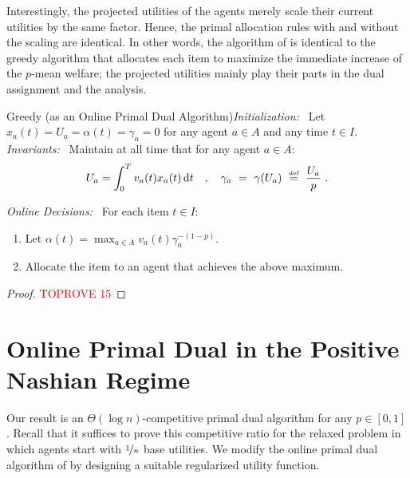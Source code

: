 \documentclass[11pt,letterpaper]{article}
\newcommand{\dif}[1]{\,\text{\rm d} #1}
\newcommand{\utility}{U}
\newcommand{\defeq}{\stackrel{\textrm{\tiny def}}{=}}
\begin{document}
Interestingly, the projected utilities of the agents merely scale their current utilities by the same factor.
Hence, the primal allocation rules with and without the scaling are identical.
In other words, the algorithm of \citet{DevanurJ:STOC:2012} is identical to the greedy algorithm that allocates each item to maximize the immediate increase of the $p$-mean welfare;
the projected utilities mainly play their parts in the dual assignment and the analysis.

\begin{algorithm}{Greedy (as an Online Primal Dual Algorithm)}\emph{Initialization:~}
   	Let $x_a(t) = \utility_a = \alpha(t) = \gamma_a = 0$ for any agent $a\in A$ and any time $t\in I$.\\[2ex]
	\emph{Invariants:~}
	Maintain at all time that for any agent $a\in A$:
    \begin{equation}
    	\label{eq:invariant-devanur-jain}
    	\utility_a = \int_0^T v_a(t) x_a(t) \dif{t} \quad,\quad \gamma_a ~=~ \gamma(\utility_a) ~\defeq~ \frac{\utility_a}{p}
		~.
	\end{equation}

	\emph{Online Decisions:~}
	For each item $t\in I$:
	\begin{enumerate}
		\item Let $\alpha(t) = \max_{a \in A} v_a(t) \gamma_a^{-(1-p)}$.
		\item Allocate the item to an agent that achieves the above maximum.
	\end{enumerate}
\end{algorithm}
	
\medskip

\begin{proof}\textcolor{red}{TOPROVE 15}\end{proof}

    
    


\section{Online Primal Dual in the Positive Nashian Regime}
\label{app:positive-nashian}







    

Our result is an $\Theta(\log n)$-competitive primal dual algorithm for any $p\in [0,1]$.
Recall that it suffices to prove this competitive ratio for the relaxed problem in which agents start with $\nicefrac{1}{n}$ base utilities.
We modify the online primal dual algorithm of \citet{DevanurJ:STOC:2012} by designing a suitable regularized utility function.
\end{document}
